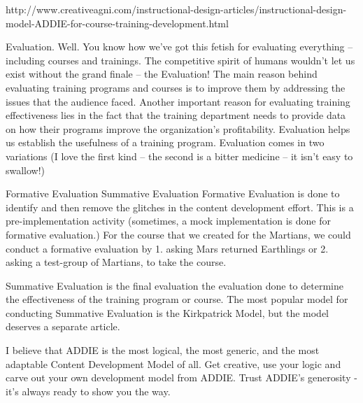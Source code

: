 {\color{red}
http://www.creativeagni.com/instructional-design-articles/instructional-design-model-ADDIE-for-course-training-development.html
  
Evaluation. Well. You know how we’ve got this fetish for evaluating everything – including courses and trainings. The competitive spirit of humans wouldn’t let us exist without the grand finale – the Evaluation! The main reason behind evaluating training programs and courses is to improve them by addressing the issues that the audience faced. Another important reason for evaluating training effectiveness lies in the fact that the training department needs to provide data on how their programs improve the organization’s profitability. Evaluation helps us establish the usefulness of a training program.
Evaluation comes in two variations (I love the first kind – the second is a bitter medicine – it isn’t easy to swallow!)

Formative Evaluation
Summative Evaluation
Formative Evaluation is done to identify and then remove the glitches in the content development effort. This is a pre-implementation activity (sometimes, a mock implementation is done for formative evaluation.) For the course that we created for the Martians, we could conduct a formative evaluation by 1. asking Mars returned Earthlings or 2. asking a test-group of Martians, to take the course.

Summative Evaluation is the final evaluation the evaluation done to determine the effectiveness of the training program or course. The most popular model for conducting Summative Evaluation is the Kirkpatrick Model, but the model deserves a separate article.

I believe that ADDIE is the most logical, the most generic, and the most adaptable Content Development Model of all. Get creative, use your logic and carve out your own development model from ADDIE. Trust ADDIE’s generosity - it’s always ready to show you the way.
}